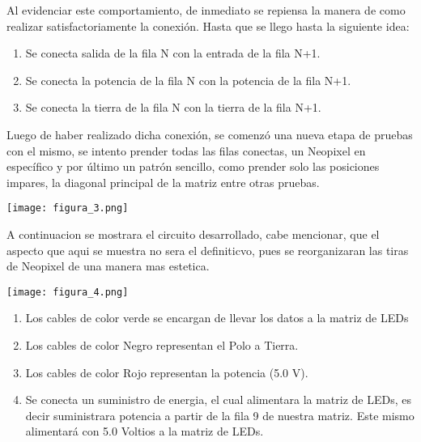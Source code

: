 \documentclass{article}
\begin{document}
Al evidenciar este comportamiento, de inmediato se repiensa la manera de como realizar satisfactoriamente la conexión. Hasta que se llego hasta la siguiente idea:
\begin{enumerate}
    \item Se conecta salida de la fila N con la entrada de la fila N+1.
    \item Se conecta la potencia de la fila N con la potencia de la fila N+1.
    \item Se conecta la tierra de la fila N con la tierra de la fila N+1.
\end{enumerate}
Luego de haber realizado dicha conexión, se comenzó una nueva etapa de pruebas con el mismo, se intento prender todas las filas conectas, un Neopixel en específico y por último un patrón sencillo, como prender solo las posiciones impares, la diagonal principal de la matriz entre otras pruebas.

\centering
\texttt{[image: figura\_3.png]}
  
A continuacion se mostrara el circuito desarrollado, cabe mencionar, que el aspecto que aqui se muestra no sera el definiticvo, pues se reorganizaran las tiras de Neopixel de una manera mas estetica.

\centering
\texttt{[image: figura\_4.png]}

\begin{enumerate}
    \item Los cables de color verde se encargan de llevar los datos a la matriz de LEDs
    \item Los cables de color Negro representan el Polo a Tierra.
    \item Los cables de color Rojo representan la potencia (5.0 V).
    \item Se conecta un suministro de energia, el cual alimentara la matriz de LEDs, es decir suministrara potencia a partir de la fila 9 de nuestra matriz. Este mismo alimentará con 5.0 Voltios a la matriz de LEDs.
\end{enumerate}


\end{document}
